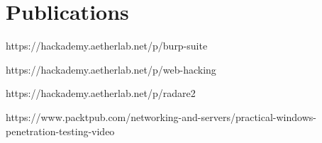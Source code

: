 \section{Publications}
{https://hackademy.aetherlab.net/p/burp-suite}

{https://hackademy.aetherlab.net/p/web-hacking}

{https://hackademy.aetherlab.net/p/radare2}

{https://www.packtpub.com/networking-and-servers/practical-windows-penetration-testing-video}